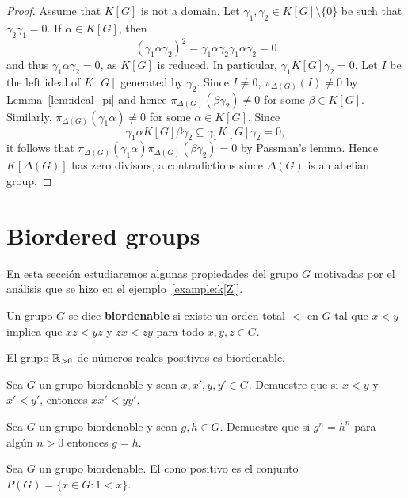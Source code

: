\begin{proof}
	Assume that $K[G]$ is not a domain. Let $\gamma_1,\gamma_2\in K[G]\setminus\{0\}$
	be such that $\gamma_2\gamma_1=0$. If $\alpha\in K[G]$, then
	\[
		(\gamma_1\alpha\gamma_2)^2=\gamma_1\alpha\gamma_2\gamma_1\alpha\gamma_2=0
	\]
	and thus $\gamma_1\alpha\gamma_2=0$, as $K[G]$ is reduced. In particular, 
	$\gamma_1K[G]\gamma_2=0$. Let $I$ be the left ideal of $K[G]$ generated 
	by $\gamma_2$. Since $I\ne 0$, $\pi_{\Delta(G)}(I)\ne 0$ by Lemma~\ref{lem:ideal_pi}
	and hence  $\pi_{\Delta(G)}(\beta\gamma_2)\ne 0$ for some $\beta\in K[G]$. 
	Similarly, 
	$\pi_{\Delta(G)}(\gamma_1\alpha)\ne 0$ for some $\alpha\in K[G]$. Since 
	\[
		\gamma_1\alpha K[G]\beta\gamma_2\subseteq \gamma_1 K[G]\gamma_2=0,
	\]
    it follows that $\pi_{\Delta(G)}(\gamma_1\alpha)\pi_{\Delta(G)}(\beta\gamma_2)=0$
    by Passman's lemma. Hence $K[\Delta(G)]$ has zero divisors, a contradictions
    since $\Delta(G)$ is an abelian group.
\end{proof}

\section{Biordered groups}

En esta sección estudiaremos algunas propiedades del grupo $G$ motivadas por el
análisis que se hizo en el ejemplo~\ref{example:k[Z]}.

\begin{definition}
	Un grupo $G$ se dice \textbf{biordenable} si existe un orden total $<$ en $G$
	tal que $x<y$ implica que $xz<yz$ y $zx<zy$ para todo $x,y,z\in G$.
\end{definition}

\begin{example}
	El grupo $\mathbb{R}_{>0}$ de números reales positivos es biordenable.
\end{example}

\begin{exercise}
	Sea $G$ un grupo biordenable y sean $x,x',y,y'\in G$. Demuestre que si
	$x<y$ y $x'<y'$, entonces $xx'<yy'$.
\end{exercise}

\begin{exercise}
	Sea $G$ un grupo biordenable y sean $g,h\in G$. Demuestre que si $g^n=h^n$
	para algún $n>0$ entonces $g=h$.
\end{exercise}

\begin{definition}
	Sea $G$ un grupo biordenable. El cono positivo es el conjunto $P(G)=\{x\in
	G:1<x\}$.
\end{definition}

